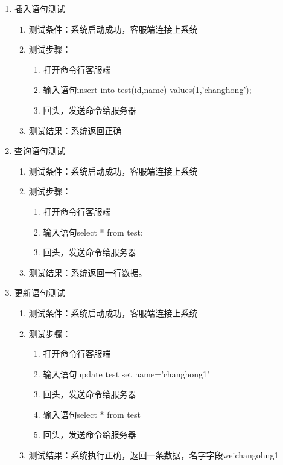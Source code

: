 \begin{enumerate}
\item 插入语句测试
\begin{enumerate}
	\item 测试条件：系统启动成功，客服端连接上系统
	\item 测试步骤：
	\begin{enumerate}
		\item 打开命令行客服端
		\item 输入语句insert into test(id,name) values(1,'changhong');
		\item 回头，发送命令给服务器
	\end{enumerate}
	\item 	测试结果：系统返回正确
\end{enumerate}	


\item 查询语句测试
\begin{enumerate}
	\item 测试条件：系统启动成功，客服端连接上系统
	\item 测试步骤：
	\begin{enumerate}
		\item 打开命令行客服端
		\item 输入语句select * from test;
		\item 回头，发送命令给服务器
	\end{enumerate}
	\item 	测试结果：系统返回一行数据。
\end{enumerate}	



\item 更新语句测试
\begin{enumerate}
	\item 测试条件：系统启动成功，客服端连接上系统
	\item 测试步骤：
	\begin{enumerate}
		\item 打开命令行客服端
		\item 输入语句update test set name='changhong1'
		\item 回头，发送命令给服务器
		\item 输入语句select * from test
		\item 回头，发送命令给服务器
	\end{enumerate}
	\item 	测试结果：系统执行正确，返回一条数据，名字字段weichangohng1
\end{enumerate}	



\end{enumerate}
